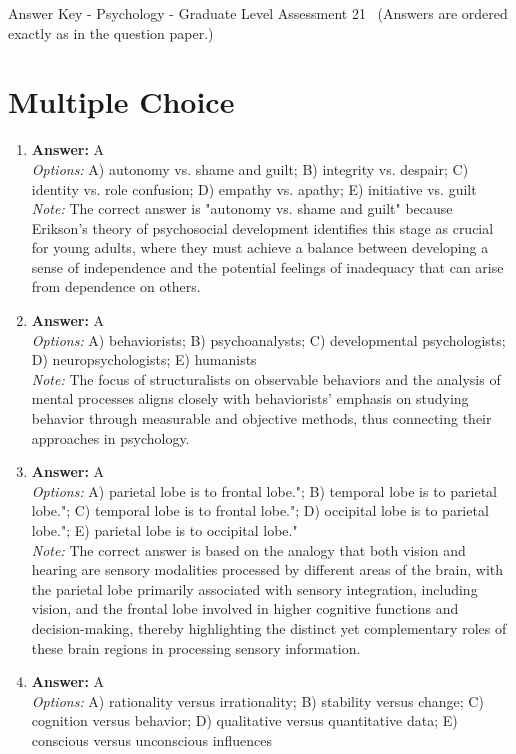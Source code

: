 \documentclass[12pt]{article}
\begin{document}
\begin{center}
Answer Key - Psychology - Graduate Level Assessment 21 \
\small (Answers are ordered exactly as in the question paper.)
\end{center}

\section*{Multiple Choice}
\begin{enumerate}[label=\arabic*.]
\item \textbf{Answer:} A
\\ \textit{Options:} A) autonomy vs. shame and guilt; B) integrity vs. despair; C) identity vs. role confusion; D) empathy vs. apathy; E) initiative vs. guilt
\\ \textit{Note:} The correct answer is "autonomy vs. shame and guilt" because Erikson's theory of psychosocial development identifies this stage as crucial for young adults, where they must achieve a balance between developing a sense of independence and the potential feelings of inadequacy that can arise from dependence on others.
\item \textbf{Answer:} A
\\ \textit{Options:} A) behaviorists; B) psychoanalysts; C) developmental psychologists; D) neuropsychologists; E) humanists
\\ \textit{Note:} The focus of structuralists on observable behaviors and the analysis of mental processes aligns closely with behaviorists' emphasis on studying behavior through measurable and objective methods, thus connecting their approaches in psychology.
\item \textbf{Answer:} A
\\ \textit{Options:} A) parietal lobe is to frontal lobe."; B) temporal lobe is to parietal lobe."; C) temporal lobe is to frontal lobe."; D) occipital lobe is to parietal lobe."; E) parietal lobe is to occipital lobe."
\\ \textit{Note:} The correct answer is based on the analogy that both vision and hearing are sensory modalities processed by different areas of the brain, with the parietal lobe primarily associated with sensory integration, including vision, and the frontal lobe involved in higher cognitive functions and decision-making, thereby highlighting the distinct yet complementary roles of these brain regions in processing sensory information.
\item \textbf{Answer:} A
\\ \textit{Options:} A) rationality versus irrationality; B) stability versus change; C) cognition versus behavior; D) qualitative versus quantitative data; E) conscious versus unconscious influences

\end{enumerate}
\end{document}
